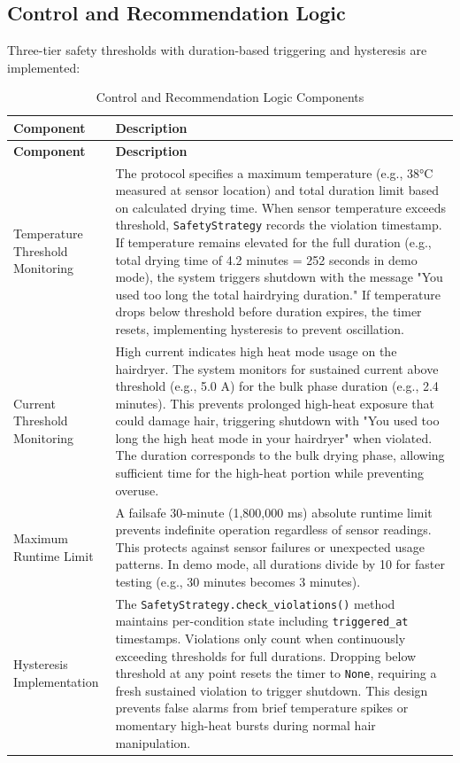 \documentclass[11pt,a4paper]{article}
\begin{document}
\subsection{Control and Recommendation Logic}

Three-tier safety thresholds with duration-based triggering and hysteresis are implemented:

\begin{longtable}{|p{}|p{}|}
\caption{Control and Recommendation Logic Components}
\label{tab:control_logic} \\
\hline
\textbf{Component} & \textbf{Description} \\
\hline
\endfirsthead
\hline
\textbf{Component} & \textbf{Description} \\
\hline
\endhead
\hline
\endfoot
\hline
\endlastfoot
Temperature Threshold Monitoring & The protocol specifies a maximum temperature (e.g., 38°C measured at sensor location) and total duration limit based on calculated drying time. When sensor temperature exceeds threshold, \texttt{SafetyStrategy} records the violation timestamp. If temperature remains elevated for the full duration (e.g., total drying time of 4.2 minutes = 252 seconds in demo mode), the system triggers shutdown with the message "You used too long the total hairdrying duration." If temperature drops below threshold before duration expires, the timer resets, implementing hysteresis to prevent oscillation. \\
\hline
Current Threshold Monitoring & High current indicates high heat mode usage on the hairdryer. The system monitors for sustained current above threshold (e.g., 5.0 A) for the bulk phase duration (e.g., 2.4 minutes). This prevents prolonged high-heat exposure that could damage hair, triggering shutdown with "You used too long the high heat mode in your hairdryer" when violated. The duration corresponds to the bulk drying phase, allowing sufficient time for the high-heat portion while preventing overuse. \\
\hline
Maximum Runtime Limit & A failsafe 30-minute (1,800,000 ms) absolute runtime limit prevents indefinite operation regardless of sensor readings. This protects against sensor failures or unexpected usage patterns. In demo mode, all durations divide by 10 for faster testing (e.g., 30 minutes becomes 3 minutes). \\
\hline
Hysteresis Implementation & The \texttt{SafetyStrategy.check\_violations()} method maintains per-condition state including \texttt{triggered\_at} timestamps. Violations only count when continuously exceeding thresholds for full durations. Dropping below threshold at any point resets the timer to \texttt{None}, requiring a fresh sustained violation to trigger shutdown. This design prevents false alarms from brief temperature spikes or momentary high-heat bursts during normal hair manipulation. \\

\end{longtable}
\end{document}
